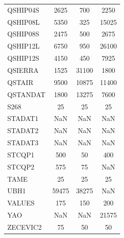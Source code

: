 \begin{longtable}{lccc}
QSHIP04S &     2625 &   700 &     2250 \\
QSHIP08L &     5350 &   325 &    15025 \\
QSHIP08S &     2475 &   500 &     2675 \\
QSHIP12L &     6750 &   950 &    26100 \\
QSHIP12S &     4150 &   450 &     7925 \\
QSIERRA  &     1525 & 31100 &     1800 \\
QSTAIR   &     9500 & 10875 &    11400 \\
QSTANDAT &     1800 & 13275 &     7600 \\
S268     &       25 &    25 &       25 \\
STADAT1  &      NaN &   NaN &      NaN \\
STADAT2  &      NaN &   NaN &      NaN \\
STADAT3  &      NaN &   NaN &      NaN \\
STCQP1   &      500 &    50 &      400 \\
STCQP2   &      575 &    75 &      NaN \\
TAME     &       25 &    25 &       25 \\
UBH1     &    59475 & 38275 &      NaN \\
VALUES   &      175 &   150 &      200 \\
YAO      &      NaN &   NaN &    21575 \\
ZECEVIC2 &       75 &    50 &       50 \\
\end{longtable}
